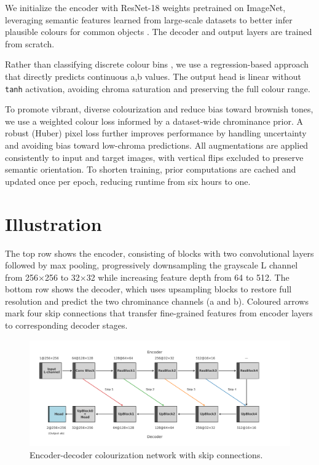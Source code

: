 \documentclass{article} %
\begin{document}
We initialize the encoder with ResNet-18 weights pretrained on ImageNet, leveraging semantic features learned from large-scale datasets to better infer plausible colours for common objects 
\citep{olah2022lettherebecolor}. The decoder and output layers are trained from scratch.

Rather than classifying discrete colour bins \citep{olah2022lettherebecolor}, we use a regression-based approach that directly predicts continuous a,b values. The output head is linear without 
\verb|tanh| activation, avoiding chroma saturation and preserving the full colour range.

To promote vibrant, diverse colourization and reduce bias toward brownish tones, we use a weighted colour loss informed by a dataset-wide chrominance prior. A robust (Huber) pixel loss further 
improves performance by handling uncertainty and avoiding bias toward low-chroma predictions. All augmentations are applied consistently to input and target images, with vertical flips excluded 
to preserve semantic orientation. To shorten training, prior computations are cached and updated once per epoch, reducing runtime from six hours to one.

\section{Illustration}

The top row shows the encoder, consisting of blocks with two convolutional layers followed by max pooling, progressively downsampling the grayscale L channel from 256$\times$256 to 32$\times$32 
while increasing feature depth from 64 to 512. The bottom row shows the decoder, which uses upsampling blocks to restore full resolution and predict the two chrominance channels (a and b). Coloured 
arrows mark four skip connections that transfer fine-grained features from encoder layers to corresponding decoder stages.

\begin{figure}[htbp]            %
  \centering
  \includegraphics[width=1.1\linewidth]{Figs/architecture-diagram.png}
  \caption{Encoder-decoder colourization network with skip connections.}
  \label{fig:architecture}
\end{figure}
\end{document}
